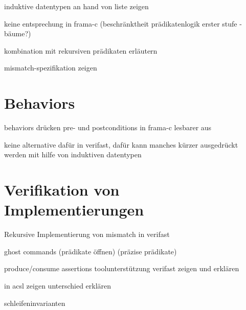 induktive datentypen an hand von liste zeigen


keine entsprechung in frama-c (beschränktheit prädikatenlogik erster stufe - bäume?)


kombination mit rekursiven prädikaten erläutern


mismatch-spezifikation zeigen


\section{Behaviors}


behaviors drücken pre- und postconditions in frama-c lesbarer aus


keine alternative dafür in verifast, dafür kann manches kürzer ausgedrückt werden mit hilfe von induktiven datentypen


\section{Verifikation von Implementierungen}

Rekursive Implementierung von mismatch
in verifast

ghost commands
(prädikate öffnen)
(präzise prädikate)


produce/consume assertions
toolunterstützung verifast zeigen und erklären


in acsl zeigen
unterschied erklären


schleifeninvarianten


